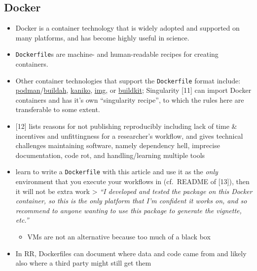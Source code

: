 \documentclass[10pt,letterpaper]{article}
\providecommand{\tightlist}{%
  \setlength{\itemsep}{0pt}\setlength{\parskip}{0pt}}
\begin{document}
\hypertarget{docker}{%
\subsection*{Docker}\label{docker}}

\begin{itemize}
\tightlist
\item
  Docker is a container technology that is widely adopted and supported
  on many platforms, and has become highly useful in science.
\item
  \texttt{Dockerfile}s are machine- and human-readable recipes for
  creating containers.
\item
  Other container technologies that support the \texttt{Dockerfile}
  format include:
  \href{https://podman.io/}{podman}/\href{https://github.com/containers/buildah}{buildah},
  \href{https://github.com/GoogleContainerTools/kaniko}{kaniko},
  \href{https://github.com/genuinetools/img}{img}, or
  \href{https://github.com/moby/buildkit}{buildkit}; Singularity
  {[}11{]} can import Docker containers and has it's own ``singularity
  recipe'', to which the rules here are transferable to some extent.
\item
  {[}12{]} lists reasons for not publishing reproducibly including lack
  of time \& incentives and unfittingness for a researcher's workflow,
  and gives technical challenges maintaining software, namely dependency
  hell, imprecise documentation, code rot, and handling/learning
  multiple tools
\item
  learn to write a \texttt{Dockerfile} with this article and use it as
  the \emph{only} environment that you execute your workflows in
  (cf.~README of {[}13{]}), then it will not be extra work
  \textgreater{} \emph{``I developed and tested the package on this
  Docker container, so this is the only platform that I'm confident it
  works on, and so recommend to anyone wanting to use this package to
  generate the vignette, etc.''}

  \begin{itemize}
  \tightlist
  \item
    VMs are not an alternative because too much of a black box
  \end{itemize}
\item
  In RR, Dockerfiles can document where data and code came from and
  likely also where a third party might still get them
\end{itemize}
\end{document}
